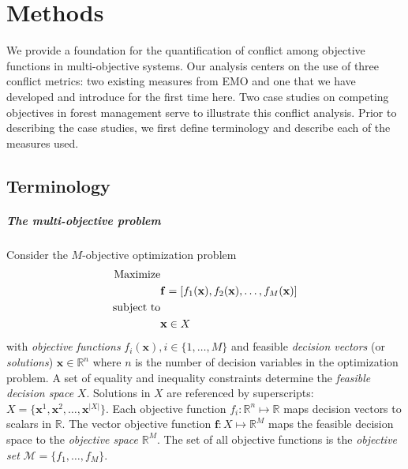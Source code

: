 \chapter{Methods}
\label{ch:methods}
We provide a foundation for the quantification of conflict among objective functions in multi-objective systems. Our analysis centers on the use of three conflict metrics: two existing measures from EMO and one that we have developed and introduce for the first time here. Two case studies on competing objectives in forest management serve to illustrate this conflict analysis. Prior to describing the case studies, we first define terminology and describe each of the measures used.

\section{Terminology}
\label{sec:terminology}
  
\paragraph{The multi-objective problem}
Consider the $M$-objective optimization problem
\begin{align}
\text{Maximize}& \notag \\
& \mathbf{f} = [f_1(\mathbf{x}), f_2(\mathbf{x}), \ldots, f_M(\mathbf{x}) ] \label{eqn:generalObj}\\
\text{subject to}& \notag \\
& \mathbf{x} \in X \label{eqn:generalConstraint}
\end{align}
with \textit{objective functions} $f_i(\mathbf{x}), i \in \{1,\ldots,M\}$ and feasible \textit{decision vectors} (or \textit{solutions}) $\mathbf{x} \in \mathbb{R}^n$ where $n$ is the number of decision variables in the optimization problem. A set of equality and inequality constraints determine the \textit{feasible decision space} $X$. Solutions in $X$ are referenced by superscripts: $X = \{\mathbf{x}^1,\mathbf{x}^2,\ldots,\mathbf{x}^{|X|}\}$. Each objective function $f_i : \mathbb{R}^n \mapsto \mathbb{R}$ maps decision vectors to scalars in $\mathbb{R}$. The vector objective function $\mathbf{f} : X \mapsto \mathbb{R}^M$ maps the feasible decision space to the \textit{objective space} $\mathbb{R}^M$. The set of all objective functions is the \textit{objective set} $\mathcal{M} = \{f_1,\ldots,f_M\}$.

